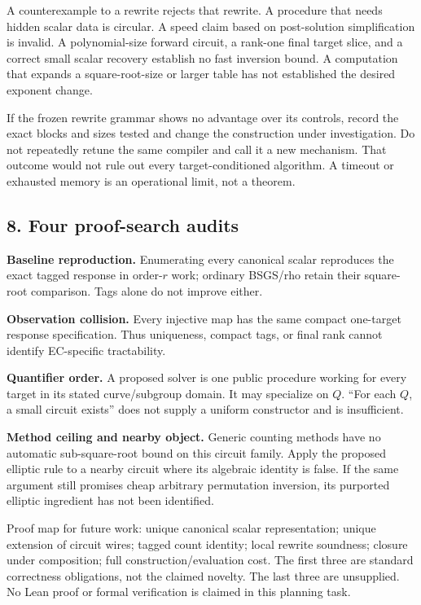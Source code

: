 \documentclass[
  10pt,
]{article}
\begin{document}
A counterexample to a rewrite rejects that rewrite. A procedure that
needs hidden scalar data is circular. A speed claim based on
post-solution simplification is invalid. A polynomial-size forward
circuit, a rank-one final target slice, and a correct small scalar
recovery establish no fast inversion bound. A computation that expands a
square-root-size or larger table has not established the desired
exponent change.

If the frozen rewrite grammar shows no advantage over its controls,
record the exact blocks and sizes tested and change the construction
under investigation. Do not repeatedly retune the same compiler and call
it a new mechanism. That outcome would not rule out every
target-conditioned algorithm. A timeout or exhausted memory is an
operational limit, not a theorem.

\subsection{8. Four proof-search audits}\label{four-proof-search-audits}

\textbf{Baseline reproduction.} Enumerating every canonical scalar
reproduces the exact tagged response in order-\(r\) work; ordinary
BSGS/rho retain their square-root comparison. Tags alone do not improve
either.

\textbf{Observation collision.} Every injective map has the same compact
one-target response specification. Thus uniqueness, compact tags, or
final rank cannot identify EC-specific tractability.

\textbf{Quantifier order.} A proposed solver is one public procedure
working for every target in its stated curve/subgroup domain. It may
specialize on \(Q\). ``For each \(Q\), a small circuit exists'' does not
supply a uniform constructor and is insufficient.

\textbf{Method ceiling and nearby object.} Generic counting methods have
no automatic sub-square-root bound on this circuit family. Apply the
proposed elliptic rule to a nearby circuit where its algebraic identity
is false. If the same argument still promises cheap arbitrary
permutation inversion, its purported elliptic ingredient has not been
identified.

Proof map for future work: unique canonical scalar representation;
unique extension of circuit wires; tagged count identity; local rewrite
soundness; closure under composition; full construction/evaluation cost.
The first three are standard correctness obligations, not the claimed
novelty. The last three are unsupplied. No Lean proof or formal
verification is claimed in this planning task.
\end{document}
